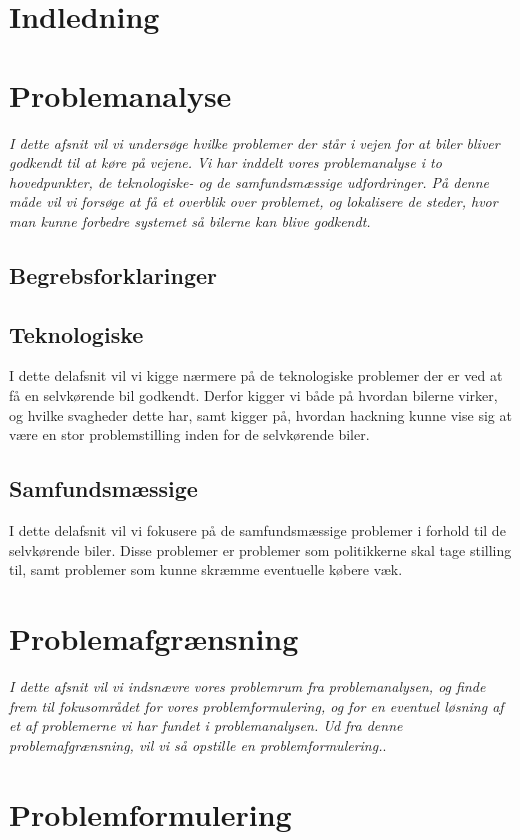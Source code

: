 \documentclass[12pt,hidelinks]{article}
\begin{document}
    \sloppy
    \titleGM
	\newpage
	\tableofcontents
	\newpage
	\section{Indledning}
	
	\section{Problemanalyse}
	\textit{I dette afsnit vil vi undersøge hvilke problemer der står i vejen for at biler bliver godkendt til at køre på vejene. Vi har inddelt vores problemanalyse i to hovedpunkter, de teknologiske- og de samfundsmæssige udfordringer. På denne måde vil vi forsøge at få et overblik over problemet, og lokalisere de steder, hvor man kunne forbedre systemet så bilerne kan blive godkendt.}
	\subsection{Begrebsforklaringer}
	
	\subsection{Teknologiske}
	I dette delafsnit vil vi kigge nærmere på de teknologiske problemer der er ved at få en selvkørende bil godkendt. Derfor kigger vi både på hvordan bilerne virker, og hvilke svagheder dette har, samt kigger på, hvordan hackning kunne vise sig at være en stor problemstilling inden for de selvkørende biler.
	
	
	
    
	\subsection{Samfundsmæssige}
	I dette delafsnit vil vi fokusere på de samfundsmæssige problemer i forhold til de selvkørende biler. Disse problemer er problemer som politikkerne skal tage stilling til, samt problemer som kunne skræmme eventuelle købere væk.
	
	
	\section{Problemafgrænsning}
	\textit{I dette afsnit vil vi indsnævre vores problemrum fra problemanalysen, og finde frem til fokusområdet for vores problemformulering, og for en eventuel løsning af et af problemerne vi har fundet i problemanalysen. Ud fra denne problemafgrænsning, vil vi så opstille en problemformulering.}.
    	
    
    \section{Problemformulering}
	
	
\end{document}
